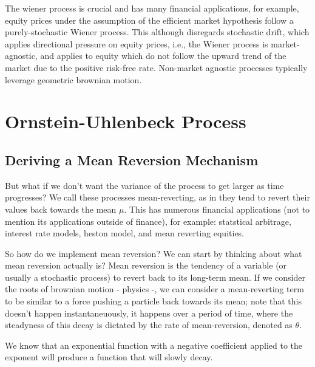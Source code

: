 \documentclass{article}
\begin{document}
\begin{spacing}{2.0}
The wiener process is crucial and has many financial applications, for example, equity prices under the assumption of the efficient
market hypothesis follow a purely-stochastic Wiener process. This although disregards stochastic drift, which applies directional
pressure on equity prices, i.e., the Wiener process is market-agnostic, and applies to equity which do not follow the upward trend
of the market due to the positive risk-free rate. Non-market agnostic processes typically leverage geometric brownian motion.


\section{Ornstein-Uhlenbeck Process}

\subsection{Deriving a Mean Reversion Mechanism}

But what if we don't want the variance of the process to get larger as time progresses? We call these processes mean-reverting, as in they
tend to revert their values back towards the mean $\mu$. This has numerous financial applications (not to mention its applications outside
of finance), for example: statstical arbitrage, interest rate models, heston model, and mean reverting equities.

So how do we implement mean reversion? We can start by thinking about what mean reversion actually is? Mean reversion is the tendency of a
variable (or usually a stochastic process) to revert back to its long-term mean. If we consider the roots of brownian motion - physics -, we
can consider a mean-reverting term to be similar to a force pushing a particle back towards its mean; note that this doesn't happen
instantaneuously, it happens over a period of time, where the steadyness of this decay is dictated by the rate of mean-reversion, denoted as
$\theta$.

We know that an exponential function with a negative coefficient applied to the exponent will produce a function that will slowly decay.

\begin{center}
\end{center}
\end{spacing}
\end{document}
